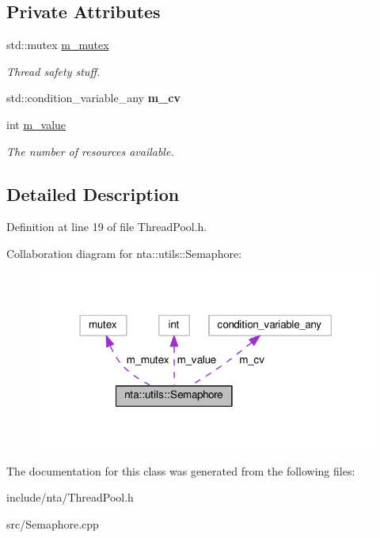 \subsection*{Private Attributes}
\begin{DoxyCompactItemize}
\item 
\mbox{\label{classnta_1_1utils_1_1Semaphore_a5d349e7ced70eb07eea6b9cfa50a6637}} 
std\+::mutex \hyperlink{classnta_1_1utils_1_1Semaphore_a5d349e7ced70eb07eea6b9cfa50a6637}{m\+\_\+mutex}
\begin{DoxyCompactList}\small\item\em Thread safety stuff. \end{DoxyCompactList}\item 
\mbox{\label{classnta_1_1utils_1_1Semaphore_a30bfcf40c58c71847933806aeab36b30}} 
std\+::condition\+\_\+variable\+\_\+any {\bfseries m\+\_\+cv}
\item 
\mbox{\label{classnta_1_1utils_1_1Semaphore_a7b21b47d4cfecfeeb97758916e23c9bc}} 
int \hyperlink{classnta_1_1utils_1_1Semaphore_a7b21b47d4cfecfeeb97758916e23c9bc}{m\+\_\+value}
\begin{DoxyCompactList}\small\item\em The number of resources available. \end{DoxyCompactList}\end{DoxyCompactItemize}


\subsection{Detailed Description}


Definition at line 19 of file Thread\+Pool.\+h.



Collaboration diagram for nta\+:\+:utils\+:\+:Semaphore\+:
\nopagebreak
\begin{figure}[H]
\begin{center}
\leavevmode
\includegraphics[width=318pt]{da/d79/classnta_1_1utils_1_1Semaphore__coll__graph}
\end{center}
\end{figure}


The documentation for this class was generated from the following files\+:\begin{DoxyCompactItemize}
\item 
include/nta/Thread\+Pool.\+h\item 
src/Semaphore.\+cpp\end{DoxyCompactItemize}
